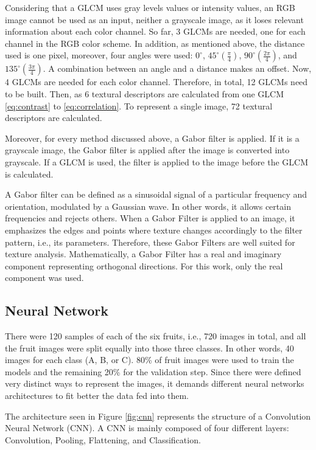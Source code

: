 \documentclass[../main.tex]{subfile}
\begin{document}
Considering that a GLCM uses gray levels values or intensity values, an RGB image cannot be used as an input, neither a grayscale image, as it loses relevant information about each color channel. So far, 3 GLCMs are needed, one for each channel in the RGB color scheme. In addition, as mentioned above, the distance used is one pixel, moreover, four angles were used: $0^{\circ}$, $45^{\circ} (\frac{\pi}{4})$, $90^{\circ} (\frac{2\pi}{4})$, and $135^{\circ} (\frac{3\pi}{4})$. A combination between an angle and a distance makes an offset. Now, 4 GLCMs are needed for each color channel. Therefore, in total, 12 GLCMs need to be built. Then, as 6 textural descriptors are calculated from one GLCM \eqref{eq:contrast} to \eqref{eq:correlation}. To represent a single image, 72 textural descriptors are calculated.

Moreover, for every method discussed above, a Gabor filter is applied. If it is a grayscale image, the Gabor filter is applied after the image is converted into grayscale. If a GLCM is used, the filter is applied to the image before the GLCM is calculated.

A Gabor filter can be defined as a sinusoidal signal of a particular frequency and orientation, modulated by a Gaussian wave. In other words, it allows certain frequencies and rejects others. When a Gabor Filter is applied to an image, it emphasizes the edges and points where texture changes accordingly to the filter pattern, i.e., its parameters. Therefore, these Gabor Filters are well suited for texture analysis. Mathematically, a Gabor Filter has a real and imaginary component representing orthogonal directions. For this work, only the real component was used.

\subsection{Neural Network} \label{subsec:neural-network}

There were 120 samples of each of the six fruits, i.e., 720 images in total, and all the fruit images were split equally into those three classes. In other words, 40 images for each class (A, B, or C). 80\% of fruit images were used to train the models and the remaining 20\% for the validation step. Since there were defined very distinct ways to represent the images, it demands different neural networks architectures to fit better the data fed into them.



The architecture seen in Figure \ref{fig:cnn} represents the structure of a Convolution Neural Network (CNN). A CNN is mainly composed of four different layers: Convolution, Pooling, Flattening, and Classification.
\end{document}
